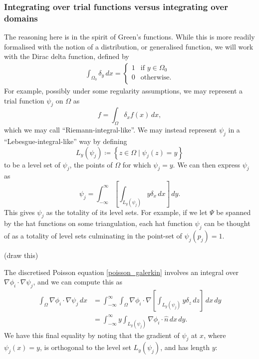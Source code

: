 \documentclass[11pt,a4paper]{memoir}
\newcommand{\om}{{\Omega}}
\newcommand{\omn}{{\Omega_0}}
\begin{document}
\subsubsection{Integrating over trial functions versus integrating over domains}
The reasoning here is in the spirit of Green's functions.
While this is more readily formalised with the notion of a distribution, or generalised function, we will work with the Dirac delta function,
defined by
\begin{align*}
    \int_{\omn} \delta_y\,dx = 
    \left\{\begin{array}{lr}
        1 &\text{if $y \in \omn$}\\
        0 &\text{otherwise}.\\
        \end{array}\right.
\end{align*}
For example, possibly under some regularity assumptions, we may represent a trial function $\psi_j$ on $\Omega$ as
    $$f = \int_\Omega \delta_x f(x)\,dx,$$
which we may call ``Riemann-integral-like''.
We may instead represent $\psi_j$ in a ``Lebesgue-integral-like'' way by defining
    $$L_y(\psi_j) \coloneqq \left\{z \in \Omega \mid \psi_j(z) = y\right\}$$
to be a level set of $\psi_j$, the points of $\Omega$ for which $\psi_j = y$. We can then express $\psi_j$ as
    $$\psi_j = \int_{-\infty}^\infty \left[\int_{L_y(\psi_j)} y\delta_x \,dx\right]\,dy.$$
This gives $\psi_j$ as the totality of its level sets.
For example, if we let $\Psi$ be spanned by the hat functions on some triangulation, each hat function $\psi_j$
can be thought of as a totality of level sets culminating in the point-set of $\psi_j(p_j) = 1$.

\vskip 0.2in
(draw this)
\vskip 0.2in

The discretised Poisson equation \eqref{poisson_galerkin} involves an integral over $\nabla \phi_i \cdot \nabla \psi_j$,
and we can compute this as
\begin{equation}\label{flux_convolution}
\begin{split}
    \int_{\om} \nabla \phi_i \cdot \nabla \psi_j\,dx
        &= \int_{-\infty}^\infty \int_{\om} \nabla\phi_i \cdot \nabla\left[\int_{L_y(\psi_j)} y\delta_z \,dz\right]\,dx\,dy\\
        &= \int_{-\infty}^\infty y \int_{L_y(\psi_j)} \nabla\phi_i \cdot \hat{n}\,dx\,dy.
\end{split}
\end{equation}
We have this final equality by noting that the gradient of $\psi_j$ at $x$, where $\psi_j(x) = y$, is orthogonal to the level set $L_y{(\psi_j)}$,
and has length $y$:
\end{document}

